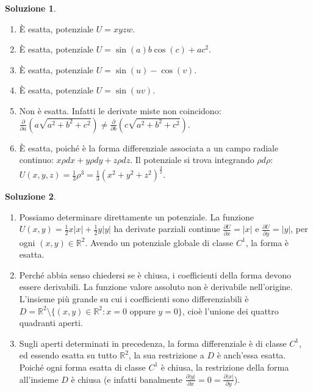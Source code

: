 \documentclass[12pt,a4paper]{article}
\theoremstyle{definition}
\newtheorem{sol}{Soluzione}
\begin{document}
\begin{sol}
    \begin{enumerate}
        \item È esatta, potenziale $U = xyzw$.
        \item È esatta, potenziale $U = \sin(a)b \cos(c) + ac^2$.
        \item È esatta, potenziale $U = \sin(u) - \cos(v)$.
        \item È esatta, potenziale $U = \sin(uv)$.
        \item Non è esatta. Infatti le derivate miste non coincidono: $\frac{\partial}{\partial a}\left( a\sqrt{a^2+b^2+c^2} \right) \neq \frac{\partial}{\partial b}\left( c\sqrt{a^2+b^2+c^2} \right)$.
        \item È esatta, poiché è la forma differenziale associata a un campo radiale continuo: $x\rho dx + y\rho dy + z\rho dz$. Il potenziale si trova integrando $\rho d\rho$: $U(x,y,z) = \frac{1}{3}\rho^3 = \frac{1}{3}(x^2+y^2+z^2)^{\frac{3}{2}}$.
    \end{enumerate}
\end{sol}

\begin{sol}
    \begin{enumerate}
        \item Possiamo determinare direttamente un potenziale. La funzione $U(x,y) = \frac{1}{2}x|x| + \frac{1}{2}y|y|$ ha derivate parziali continue $\frac{\partial U}{\partial x} = |x|$ e $\frac{\partial U}{\partial y} = |y|$, per ogni $(x,y) \in \mathbb{R}^2$. Avendo un potenziale globale di classe $C^1$, la forma è esatta.
        \item Perché abbia senso chiedersi se è chiusa, i coefficienti della forma devono essere derivabili. La funzione valore assoluto non è derivabile nell'origine. L'insieme più grande su cui i coefficienti sono differenziabili è $D = \mathbb{R}^2 \setminus \{(x,y) \in \mathbb{R}^2 : x=0 \text{ oppure } y=0\}$, cioè l'unione dei quattro quadranti aperti.
        \item Sugli aperti determinati in precedenza, la forma differenziale è di classe $C^1$, ed essendo esatta su tutto $\mathbb{R}^2$, la sua restrizione a $D$ è anch'essa esatta. Poiché ogni forma esatta di classe $C^1$ è chiusa, la restrizione della forma all'insieme $D$ è chiusa (e infatti banalmente $\frac{\partial |y|}{\partial x} = 0 = \frac{\partial |x|}{\partial y}$).
    \end{enumerate}
\end{sol}
\end{document}
